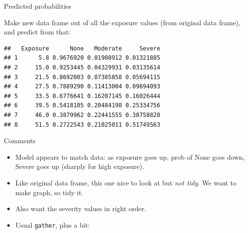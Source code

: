 \documentclass[ignorenonframetext,]{beamer}
\newenvironment{Shaded}{\begin{snugshade}}{\end{snugshade}}
\newcommand{\DataTypeTok}[1]{\textcolor[rgb]{0.13,0.29,0.53}{#1}}
\newcommand{\FloatTok}[1]{\textcolor[rgb]{0.00,0.00,0.81}{#1}}
\newcommand{\KeywordTok}[1]{\textcolor[rgb]{0.13,0.29,0.53}{\textbf{#1}}}
\newcommand{\NormalTok}[1]{#1}
\newcommand{\OperatorTok}[1]{\textcolor[rgb]{0.81,0.36,0.00}{\textbf{#1}}}
\newcommand{\StringTok}[1]{\textcolor[rgb]{0.31,0.60,0.02}{#1}}
\begin{document}
\begin{frame}[fragile]{Predicted probabilities}
\protect\hypertarget{predicted-probabilities}{}

Make new data frame out of all the exposure values (from original data
frame), and predict from that:

\begin{Shaded}
\end{Shaded}

\begin{verbatim}
##   Exposure      None   Moderate     Severe
## 1      5.8 0.9676920 0.01908912 0.01321885
## 2     15.0 0.9253445 0.04329931 0.03135614
## 3     21.5 0.8692003 0.07385858 0.05694115
## 4     27.5 0.7889290 0.11413004 0.09694093
## 5     33.5 0.6776641 0.16207145 0.16026444
## 6     39.5 0.5418105 0.20484198 0.25334756
## 7     46.0 0.3879962 0.22441555 0.38758828
## 8     51.5 0.2722543 0.21025011 0.51749563
\end{verbatim}

\end{frame}

\begin{frame}[fragile]{Comments}
\protect\hypertarget{comments-14}{}

\begin{itemize}
\item
  Model appears to match data: as exposure goes up, prob of None goes
  down, Severe goes up (sharply for high exposure).
\item
  Like original data frame, this one nice to look at but \emph{not
  tidy}. We want to make graph, so tidy it.
\item
  Also want the severity values in right order.
\item
  Usual \texttt{gather}, plus a bit:
\end{itemize}

\begin{Shaded}
\end{Shaded}

\end{frame}
\end{document}
